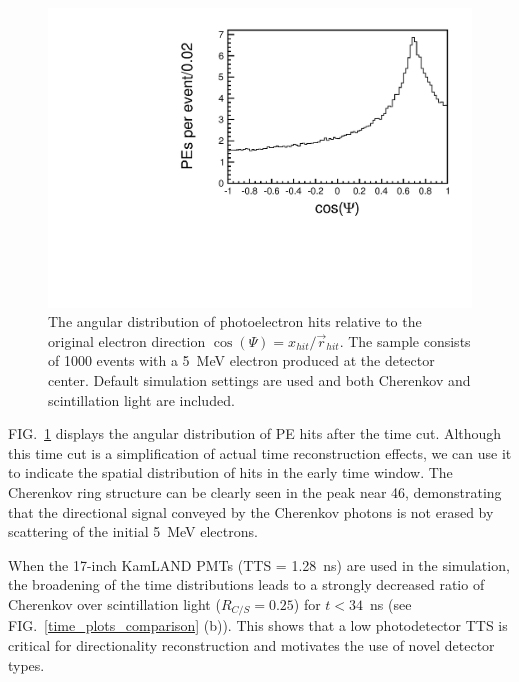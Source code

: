 \documentclass[aps,prc,twocolumn,groupedaddress,showpacs,amsmath,amssymb,floatfix,superscriptaddress]{revtex4}
\begin{document}
\begin{figure}
        \begin{center}
        \includegraphics[scale=0.40]{graphs/cos_psi_34_h.pdf}
        \caption[]{The angular distribution of photoelectron hits
        relative to the original electron direction $\cos(\Psi) =
        x_{hit}/\vec{r}_{hit}$. The sample consists of 1000 events
        with a 5~MeV electron produced at the detector center. Default
        simulation settings are used and both Cherenkov and
        scintillation light are included.} 
        \label{Cherenkov_cone}
        \end{center}
\end{figure}

FIG.~\ref{Cherenkov_cone} displays the angular distribution of PE
hits after the time cut. Although this time cut is a simplification of actual time
reconstruction effects, we can use it to indicate the spatial
distribution of hits in the early time window. The Cherenkov ring structure
can be clearly seen in the peak near 46\textdegree, demonstrating
that the directional signal conveyed by the Cherenkov photons is not
erased by scattering of the initial 5~MeV electrons.

When the 17-inch KamLAND PMTs \cite{tajimaMaster,kume_1983} (TTS =
1.28~ns) are used in the simulation, the broadening of the time
distributions leads to a strongly decreased ratio of Cherenkov over
scintillation light ($R_{C/S}=0.25$) for $t<34$~ns (see
FIG.~\ref{time_plots_comparison} (b)). This shows that a low
photodetector TTS is critical for directionality reconstruction and
motivates the use of novel detector types.
\end{document}
